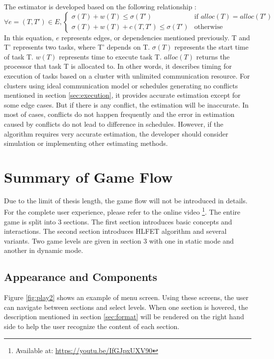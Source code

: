 \documentclass[msc,deptreport, cs]{infthesis}
\begin{document}
The estimator is developed based on the following relationship \cite{Robert2011}:
\begin{equation*}
  \forall e = (T, T') \in E, 
  \begin{cases}
    \sigma (T) + w(T) \leq \sigma(T') & \text{if } alloc(T) = alloc(T')\\
    \sigma (T) + w(T) + c(T, T') \leq \sigma(T')              & \text{otherwise}
\end{cases}
\label{eq:task}
\end{equation*}
In this equation, $e$ represents edges, or dependencies mentioned previously. T and T' represents two tasks, where T' depends on T. $\sigma(T)$ represents the start time of task T. $w(T)$ represents time to execute task T. $alloc(T)$ returns the processor that task T is allocated to. In other words, it describes timing for execution of tasks based on a cluster with unlimited communication resource. For clusters using ideal communication model or schedules generating no conflicts mentioned in section \ref{sec:execution}, it provides accurate estimation except for some edge cases. But if there is any conflict, the estimation will be inaccurate. In most of cases, conflicts do not happen frequently and the error in estimation caused by conflicts do not lead to difference in schedules. However, if the algorithm requires very accurate estimation, the developer should consider simulation or implementing other estimating methods.

\chapter{Summary of Game Flow}

Due to the limit of thesis length, the game flow will not be introduced in details. For the complete user experience, please refer to the online video \footnote{Available at: \url{https://youtu.be/IfGJpxUXV90}}. The entire game is split into 3 sections. The first section introduces basic concepts and interactions. The second section introduces HLFET algorithm and several variants. Two game levels are given in section 3 with one in static mode and another in dynamic mode.

\section{Appearance and Components}

Figure \ref{fig:play2} shows an example of menu screen. Using these screens, the user can navigate between sections and select levels. When one section is hovered, the description mentioned in section \ref{sec:format} will be rendered on the right hand side to help the user recognize the content of each section.
\end{document}
